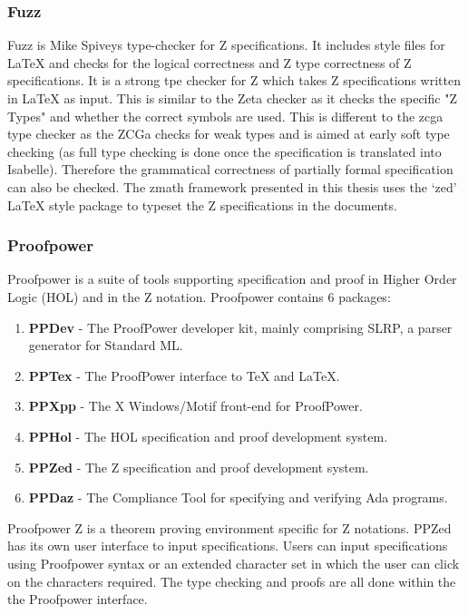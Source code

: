 \subsubsection{Fuzz}
Fuzz \cite{spiveyfuzz} is Mike Spiveys type-checker for Z specifications.
It includes style files for \LaTeX{} and checks for the logical correctness and
Z type correctness of Z specifications. It is a strong tpe checker for Z which
takes Z specifications written in \LaTeX{} as input. This is similar to the Zeta
checker as it checks the specific "Z Types" and whether the correct symbols are
used. This is different to the \gls{zcga} type
checker as the ZCGa checks for weak types and is aimed at early soft type
checking (as full type checking is done once the specification is translated
into Isabelle). Therefore the grammatical correctness
of partially formal specification can also be checked. The \gls{zmath} framework
presented in this thesis uses the `zed' \LaTeX{} style package to typeset the Z
specifications in the documents.

\subsubsection{Proofpower}
Proofpower \cite{pp} is a suite of tools supporting specification and proof in
Higher Order Logic (HOL) and in the Z notation. Proofpower contains 6 packages:
\begin{enumerate}
    \item \textbf{PPDev} - The ProofPower developer kit, mainly comprising SLRP, a parser generator for Standard ML.
    \item \textbf{PPTex} - The ProofPower interface to TeX and LaTeX.
    \item \textbf{PPXpp} - The X Windows/Motif front-end for ProofPower.
    \item \textbf{PPHol} - The HOL specification and proof development system.
    \item \textbf{PPZed} - The Z specification and proof development system.
    \item \textbf{PPDaz} - The Compliance Tool for specifying and verifying Ada programs.
\end{enumerate}

Proofpower Z is a theorem proving environment specific for Z notations. PPZed has
its own user interface to input specifications. Users can input specifications
using Proofpower syntax or an extended character set in which the user can click
on the characters required. The type checking and proofs are all done within the
the Proofpower interface.


